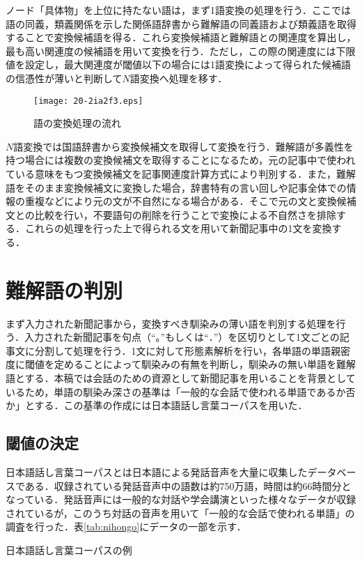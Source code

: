 \documentclass[japanese]{jnlp_1.4}
\begin{document}
ノード「具体物」を上位に持たない語は，まず1語変換の処理を行う．ここでは語の同義，類義関係を示した関係語辞書から難解語の同義語および類義語を取得することで変換候補語を得る．これら変換候補語と難解語との関連度を算出し，最も高い関連度の候補語を用いて変換を行う．ただし，この際の関連度には下限値を設定し，最大関連度が閾値以下の場合には1語変換によって得られた候補語の信憑性が薄いと判断して$N$語変換へ処理を移す．

\begin{figure}[t]
 \begin{center}
  \texttt{[image: 20-2ia2f3.eps]}
 \end{center}
 \caption{語の変換処理の流れ}
 \label{fig:nagare}
\end{figure}

$N$語変換では国語辞書から変換候補文を取得して変換を行う．難解語が多義性を持つ場合には複数の変換候補文を取得することになるため，元の記事中で使われている意味をもつ変換候補文を記事関連度計算方式により判別する．また，難解語をそのまま変換候補文に変換した場合，辞書特有の言い回しや記事全体での情報の重複などにより元の文が不自然になる場合がある．そこで元の文と変換候補文との比較を行い，不要語句の削除を行うことで変換による不自然さを排除する．これらの処理を行った上で得られる文を用いて新聞記事中の1文を変換する．


\section{難解語の判別}
\label{ikiti}
まず入力された新聞記事から，変換すべき馴染みの薄い語を判別する処理を行う．入力された新聞記事を句点（“。”もしくは“．”）を区切りとして1文ごとの記事文に分割して処理を行う．1文に対して形態素解析を行い，各単語の単語親密度に閾値を定めることによって馴染みの有無を判断し，馴染みの無い単語を難解語とする．本稿では会話のための資源として新聞記事を用いることを背景としているため，単語の馴染み深さの基準は「一般的な会話で使われる単語であるか否か」とする．この基準の作成には日本語話し言葉コーパス\cite{Book_03}を用いた．


\subsection{閾値の決定}
\label{ikiti_hyouka}

日本語話し言葉コーパスとは日本語による発話音声を大量に収集したデータベースである．収録されている発話音声中の語数は約750万語，時間は約66時間分となっている．発話音声には一般的な対話や学会講演といった様々なデータが収録されているが，このうち対話の音声を用いて「一般的な会話で使われる単語」の調査を行った．表\ref{tab:nihongo}にデータの一部を示す．
\begin{table}[b]
\vspace{-0.5\Cvs}
\caption{日本語話し言葉コーパスの例}
\label{tab:nihongo}

\end{table}
\end{document}

